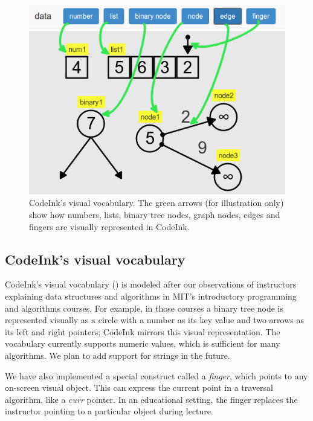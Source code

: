 \begin{figure} %

\begin{center}
\includegraphics[width=0.8\columnwidth]{img/visual-vocabulary.png}
\end{center}

\vspace{-0.75em}
\caption{CodeInk's visual vocabulary. The green arrows (for illustration only)
show how numbers, lists, binary tree nodes, graph nodes, edges and fingers are
visually represented in CodeInk.}

\label{fig:visual_vocab}
\end{figure}

\subsection{CodeInk's visual vocabulary}

CodeInk's visual vocabulary () is modeled after our
observations of instructors explaining data structures and algorithms in MIT's
introductory programming and algorithms courses. For example, in those courses a
binary tree node is represented visually as a circle with a number as its key
value and two arrows as its left and right pointers; CodeInk mirrors this visual
representation. The vocabulary currently supports numeric
values, which is sufficient for many algorithms. We plan to add support for
strings in the future.

We have also implemented a special construct called a \emph{finger}, which
points to any on-screen visual object. This can express the current point in a
traversal algorithm, like a \emph{curr} pointer. In an educational setting, the
finger replaces the instructor pointing to a particular object during lecture.

